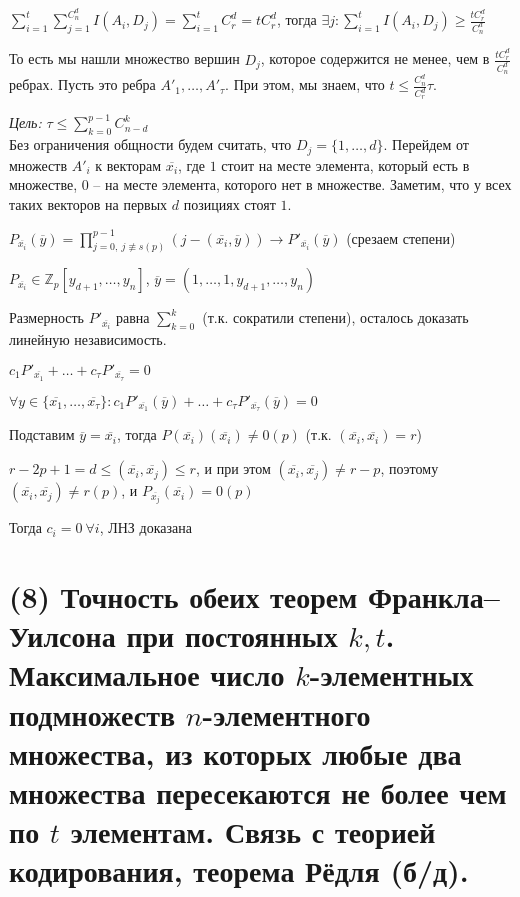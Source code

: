 $\sum\limits_{i=1}^t \sum\limits_{j=1}^{C_n^d} I(A_i, D_j) = \sum\limits_{i=1}^t C_r^d = tC_r^d$, тогда $\exists j : \sum\limits_{i=1}^t I(A_i, D_j) \ge \frac{tC_r^d}{C_n^d}$

То есть мы нашли множество вершин $D_j$, которое содержится не менее, чем в $\frac{tC_r^d}{C_n^d}$ ребрах. Пусть это ребра $A'_1, \ldots, A'_{\tau}$. При этом, мы знаем, что $t \le \frac{C_n^d}{C_r^d}\tau$.

\textit{Цель:} $\tau \le \sum\limits_{k=0}^{p-1}C_{n-d}^k$\\

Без ограничения общности будем считать, что $D_j = \{1, \ldots, d\}$. Перейдем от множеств $A'_i$ к векторам $\overline{x_i}$, где $1$ стоит на месте элемента, который есть в множестве, $0$ -- на месте элемента, которого нет в множестве. Заметим, что у всех таких векторов на первых $d$ позициях стоят $1$.

$P_{\overline{x_i}}(\overline{y}) = \prod\limits_{j = 0, \ j \not\equiv s (p)}^{p - 1}(j - (\overline{x_i}, \overline{y})) \to P'_{\overline{x_i}}(\overline{y})$ (срезаем степени)

$P_{\overline{x_i}} \in \mathbb{Z}_p[y_{d+1}, \ldots, y_n]$, $\overline{y} = (1, \dots, 1, y_{d+1}, \ldots, y_n)$

Размерность $P'_{\overline{x_i}}$ равна $\sum\limits_{k=0}^k$ (т.к. сократили степени), осталось доказать линейную независимость.

$c_1P'_{\overline{x_1}} + \ldots + c_{\tau}P'_{\overline{x_{\tau}}} = 0$

$\forall y \in \{\overline{x_1}, \ldots, \overline{x_{\tau}}\} : c_1P'_{\overline{x_1}}(\overline{y}) + \ldots + c_{\tau}P'_{\overline{x_{\tau}}}(\overline{y}) = 0$

Подставим $\overline{y} = \overline{x_i}$, тогда $P(\overline{x_i})(\overline{x_i}) \neq 0(p)$ (т.к. $(\overline{x_i}, \overline{x_i}) = r$)

$r - 2p + 1 = d \le (\overline{x_i}, \overline{x_j}) \le r$, и при этом $(\overline{x_i}, \overline{x_j}) \neq r-p$, поэтому $(\overline{x_i}, \overline{x_j}) \neq r(p)$, и $P_{\overline{x_j}}(\overline{x_i}) = 0(p)$

Тогда $c_i = 0 \ \forall i$, ЛНЗ доказана

\EndProof
\newpage{}

\section{(8) Точность обеих теорем Франкла–Уилсона при постоянных $k, t$. Максимальное число $k$-элементных подмножеств $n$-элементного множества, из которых любые два множества пересекаются не более чем по $t$ элементам. Связь с теорией кодирования, теорема Рёдля (б/д).}


